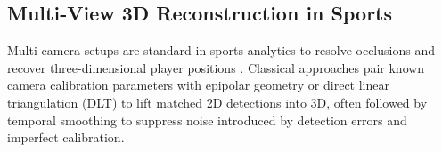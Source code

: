 \subsection{Multi-View 3D Reconstruction in Sports}
Multi-camera setups are standard in sports analytics to resolve occlusions and
recover three-dimensional player positions \cite{survey}.
Classical approaches pair known camera calibration parameters with epipolar
geometry or direct linear triangulation (DLT) to lift matched 2D detections into
3D, often followed by temporal smoothing to suppress noise introduced by detection
errors and imperfect calibration.
